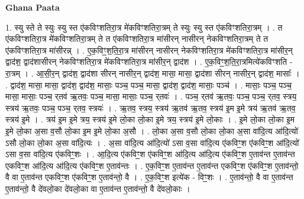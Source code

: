 \documentclass[17pt]{extarticle}
\begin{document}
\textbf{Ghana Paata } \newline

1. स्यु स्ते ते स्युः स्यु स्त ए॑कविꣳशतिरा॒त्र मे॑कविꣳशतिरा॒त्रम् ते स्युः स्यु स्त ए॑कविꣳशतिरा॒त्रम् । . त ए॑कविꣳशतिरा॒त्र मे॑कविꣳशतिरा॒त्रम् ते त ए॑कविꣳशतिरा॒त्र मा॑सीरन् नासीरन् नेकविꣳशतिरा॒त्रम् ते त ए॑कविꣳशतिरा॒त्र मा॑सीरन्न् । . ए॒क॒विꣳ॒॒श॒ति॒रा॒त्र मा॑सीरन् नासीरन् नेकविꣳशतिरा॒त्र मे॑कविꣳशतिरा॒त्र मा॑सीर॒न् द्वाद॑श॒ द्वाद॑शासीरन् नेकविꣳशतिरा॒त्र मे॑कविꣳशतिरा॒त्र मा॑सीर॒न् द्वाद॑श । . ए॒क॒विꣳ॒॒श॒ति॒रा॒त्रमित्ये॑कविꣳशति - रा॒त्रम् । . आ॒सी॒र॒न् द्वाद॑श॒ द्वाद॑शा सीरन् नासीर॒न् द्वाद॑श॒ मासा॒ मासा॒ द्वाद॑शा सीरन् नासीर॒न् द्वाद॑श॒ मासाः᳚ । . द्वाद॑श॒ मासा॒ मासा॒ द्वाद॑श॒ द्वाद॑श॒ मासाः॒ पञ्च॒ पञ्च॒ मासा॒ द्वाद॑श॒ द्वाद॑श॒ मासाः॒ पञ्च॑ । . मासाः॒ पञ्च॒ पञ्च॒ मासा॒ मासाः॒ पञ्च॒ र्‌तव॑ ऋ॒तवः॒ पञ्च॒ मासा॒ मासाः॒ पञ्च॒ र्‌तवः॑ । . पञ्च॒ र्‌तव॑ ऋ॒तवः॒ पञ्च॒ पञ्च॒ र्‌तव॒ स्त्रय॒ स्त्रय॑ ऋ॒तवः॒ पञ्च॒ पञ्च॒ र्‌तव॒ स्त्रयः॑ । . ऋ॒तव॒ स्त्रय॒ स्त्रय॑ ऋ॒तव॑ ऋ॒तव॒ स्त्रय॑ इ॒म इ॒मे त्रय॑ ऋ॒तव॑ ऋ॒तव॒ स्त्रय॑ इ॒मे । . त्रय॑ इ॒म इ॒मे त्रय॒ स्त्रय॑ इ॒मे लो॒का लो॒का इ॒मे त्रय॒ स्त्रय॑ इ॒मे लो॒काः । . इ॒मे लो॒का लो॒का इ॒म इ॒मे लो॒का अ॒सा व॒सौ लो॒का इ॒म इ॒मे लो॒का अ॒सौ । . लो॒का अ॒सा व॒सौ लो॒का लो॒का अ॒सा वा॑दि॒त्य आ॑दि॒त्यो॑ ऽसौ लो॒का लो॒का अ॒सा वा॑दि॒त्यः । . अ॒सा वा॑दि॒त्य आ॑दि॒त्यो॑ ऽसा व॒सा वा॑दि॒त्य ए॑कविꣳ॒॒श ए॑कविꣳ॒॒श आ॑दि॒त्यो॑ ऽसा व॒सा वा॑दि॒त्य ए॑कविꣳ॒॒शः । . आ॒दि॒त्य ए॑कविꣳ॒॒श ए॑कविꣳ॒॒श आ॑दि॒त्य आ॑दि॒त्य ए॑कविꣳ॒॒श ए॒ताव॑न्त ए॒ताव॑न्त एकविꣳ॒॒श आ॑दि॒त्य आ॑दि॒त्य ए॑कविꣳ॒॒श ए॒ताव॑न्तः । . ए॒क॒विꣳ॒॒श ए॒ताव॑न्त ए॒ताव॑न्त एकविꣳ॒॒श ए॑कविꣳ॒॒श ए॒ताव॑न्तो॒ वै वा ए॒ताव॑न्त एकविꣳ॒॒श ए॑कविꣳ॒॒श ए॒ताव॑न्तो॒ वै । . ए॒क॒विꣳ॒॒श इत्ये॑क - विꣳ॒॒शः । . ए॒ताव॑न्तो॒ वै वा ए॒ताव॑न्त ए॒ताव॑न्तो॒ वै दे॑वलो॒का दे॑वलो॒का वा ए॒ताव॑न्त ए॒ताव॑न्तो॒ वै दे॑वलो॒काः । \newline
\end{document}
